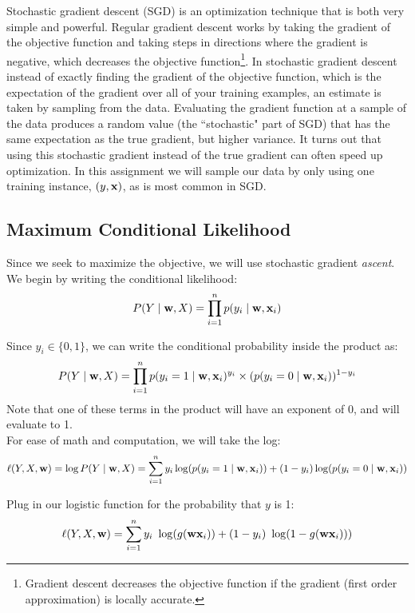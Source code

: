\documentclass[11pt]{article}
\newcommand{\vw}{{\bf w}}
\newcommand{\vx}{{\bf x}}
\newcommand{\vxi}{{\bf x}_i}
\newcommand{\yi}{y_i}
\begin{document}
Stochastic gradient descent (SGD) is an optimization technique that is both very simple and powerful. Regular gradient descent works by taking the gradient of the objective function and taking steps in directions where the gradient is negative, which decreases the objective function\footnote{Gradient descent decreases the objective function if the gradient (first order approximation) is locally accurate.}. In stochastic gradient descent instead of exactly finding the gradient of the objective function, which is the expectation of the gradient over all of your training examples, an estimate is taken by sampling from the data. Evaluating the gradient function at a sample of the data produces a random value (the ``stochastic" part of SGD) that has the same expectation as the true gradient, but higher variance. It turns out that using this stochastic gradient instead of the true gradient can often speed up optimization. In this assignment we will sample our data by only using one training instance, $(y, \vx)$, as is most common in SGD.

\subsection{Maximum Conditional Likelihood}
Since we seek to maximize the objective, we will use stochastic gradient \emph{ascent}. We begin by writing the conditional likelihood:
\begin{equation}
P(Y \mid \vw, X) = \prod_{i=1}^n{p(\yi \mid \vw, \vxi)}
\end{equation}

Since $\yi \in \{ 0,1 \}$, we can write the conditional probability inside the product as:
\begin{equation}
P(Y \mid \vw, X) = \prod_{i=1}^n{ p(\yi=1 \mid \vw, \vxi)^{\yi} \times (p(\yi=0 \mid \vw, \vxi))^{1-\yi}}
\end{equation}
Note that one of these terms in the product will have an exponent of 0, and will evaluate to 1.\\

For ease of math and computation, we will take the log:
\begin{equation}
\ell(Y,X,\vw) = \log P(Y \mid \vw, X) = \sum_{i=1}^n{ \yi \log(p(\yi=1 \mid \vw, \vxi)) + (1-\yi)\log(p(\yi=0 \mid \vw, \vxi))}
\end{equation}

Plug in our logistic function for the probability that $y$ is 1:
\begin{equation}
\ell(Y,X,\vw) = \sum_{i=1}^n{ y_i\ \log( g(\vw \vxi) ) + (1-y_i)\ \log( 1-g(\vw \vxi) ))}
\end{equation}
\end{document}
